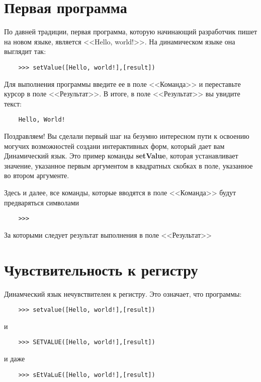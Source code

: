 \documentclass[../index.tex]{subfiles}
\begin{document}
	\section{Первая программа}
	
	По давней традиции, первая программа, которую начинающий разработчик пишет на новом языке, является <<Hello, world!>>. На динамическом языке она выглядит так:
	\begin{verbatim}
	>>> setValue([Hello, world!],[result])
	\end{verbatim}
	
	Для выполнения программы введите ее в поле <<Команда>> и переставьте курсор в поле <<Результат>>. В итоге, в поле <<Результат>> вы увидите текст:
	
	\begin{verbatim}
	Hello, World!
	\end{verbatim}
	
	Поздравляем! Вы сделали первый шаг на безумно интересном пути к освоению могучих возможностей создани интерактивных форм, который дает вам Динамический язык.
	Это пример команды {\bf setValue}, которая устанавливает значение, указанное первым аргументом в квадратных скобках в поле, указанное во втором аргументе.
	
	Здесь и далее, все команды, которые вводятся в поле <<Команда>> будут предваряться символами 	\begin{verbatim}
	>>>
	\end{verbatim}	За которыми следует результат выполнения в поле <<Результат>>
	
	\section{Чувствительность к регистру}
	
	Динамческий язык нечувствителен к регистру. Это означает, что программы:
	
	\begin{verbatim}
	>>> setvalue([Hello, world!],[result])
	\end{verbatim}
	
	и
	
	\begin{verbatim}
	>>> SETVALUE([Hello, world!],[result])
	\end{verbatim}
	
	и даже
	
	\begin{verbatim}
	>>> sEtVaLuE([Hello, world!],[result])
	\end{verbatim}
	
\end{document}
